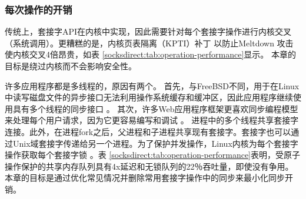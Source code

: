 \subsubsection{每次操作的开销}
\label{socksdirect:subsec:per-operation-overhead}

传统上，套接字API在内核中实现，因此需要针对每个套接字操作进行内核交叉（系统调用）。更糟糕的是，内核页表隔离（KPTI）补丁 \cite {kpti}以防止Meltdown \cite {Lipp2018meltdown}攻击使内核交叉4倍昂贵，如表 \ref {socksdirect:tab:operation-performance}显示。
本章的目标是绕过内核而不会影响安全性。

许多应用程序都是多线程的，原因有两个。
首先，与FreeBSD不同，用于在Linux中读写磁盘文件的异步接口无法利用操作系统缓存和缓冲区，因此应用程序继续使用具有多个线程的同步接口 \cite {nginx-multi-thread}。
其次，许多Web应用程序框架更喜欢同步编程模型来处理每个用户请求，因为它更容易编写和调试 \cite {barroso2017attack}。
进程中的多个线程共享套接字连接。此外，在进程fork之后，父进程和子进程共享现有套接字。套接字也可以通过Unix域套接字传递给另一个进程。为了保护并发操作，Linux内核为每个套接字操作获取每个套接字锁 \cite {boyd2010analysis,han2012megapipe,lin2016scalable}。表 \ref {socksdirect:tab:operation-performance}表明，受原子操作保护的共享内存队列具有4x延迟和无锁队列的22％吞吐量，即使没有争用。
本章的目标是通过优化常见情况并删除常用套接字操作中的同步来最小化同步开销。






